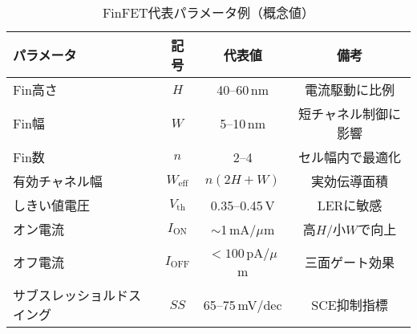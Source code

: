 \begin{table}[t]
  \centering
  \caption{FinFET代表パラメータ例（概念値）}
  \label{tab:finfet_params}
  \begin{tabular}{lccc}
    \toprule
    パラメータ & 記号 & 代表値 & 備考 \\
    \midrule
    Fin高さ & $H$ & 40–60\,nm & 電流駆動に比例 \\
    Fin幅   & $W$ & 5–10\,nm & 短チャネル制御に影響 \\
    Fin数   & $n$ & 2–4 & セル幅内で最適化 \\
    有効チャネル幅 & $W_\mathrm{eff}$ & $n(2H+W)$ & 実効伝導面積 \\
    しきい値電圧 & $V_\mathrm{th}$ & 0.35–0.45\,V & LERに敏感 \\
    オン電流 & $I_\mathrm{ON}$ & $\sim$1\,mA/$\mu$m & 高$H$/小$W$で向上 \\
    オフ電流 & $I_\mathrm{OFF}$ & $<100$\,pA/$\mu$m & 三面ゲート効果 \\
    サブスレッショルドスイング & $SS$ & 65–75\,mV/dec & SCE抑制指標 \\
    \bottomrule
  \end{tabular}
\end{table}
